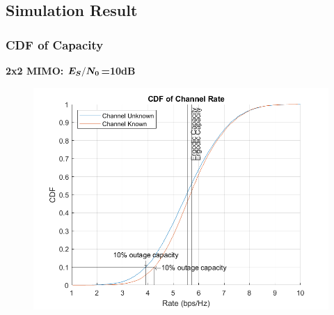 \documentclass{article}
\newcommand{\bd}{\textbf} %
\begin{document}
\subsection{Simulation Result}
\subsubsection{CDF of Capacity}
\bd{2x2 MIMO: $\boldsymbol{E_S$/$N_0}$=10dB}
\begin{figure}[H]
	\centering
	\includegraphics[width=.5\textwidth]{a.png}
	\caption{}
\end{figure}
\end{document}
